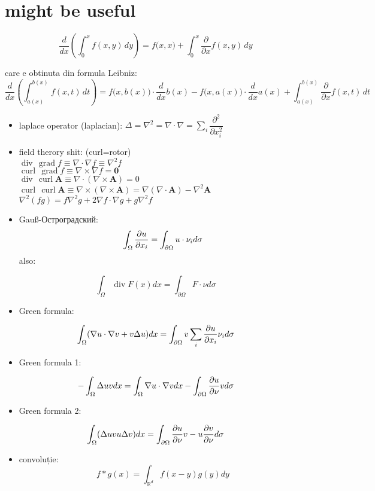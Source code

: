 \documentclass[11pt]{article}
\date{\today}
\title{}
\newcommand{\R}{\mathbb{R}} \newcommand{\C}{\mathbb{C}}
\begin{document}
\section*{might be useful}
\label{sec:org6671fb4}
\[ \frac{d}{dx} \left (\int_{0}^{x} f(x,y)\,dy \right) = f\big(x,x) + \int_{0}^{x}\frac{\partial}{\partial x} f(x,y) \,dy\]

\medskip

care e obtinuta din formula Leibniz:
\[ \frac{d}{dx} \left (\int_{a(x)}^{b(x)}f(x,t)\,dt \right) = f\big(x,b(x)\big)\cdot \frac{d}{dx} b(x) - f\big(x,a(x)\big)\cdot \frac{d}{dx} a(x) + \int_{a(x)}^{b(x)}\frac{\partial}{\partial x} f(x,t) \,dt\]
\begin{itemize}
\item laplace operator (laplacian): \(\Delta = \nabla^2 = \nabla \cdot \nabla = \displaystyle \sum_i \dfrac{\partial^2}{\partial x_i^2}\)
\item field therory shit: (curl=rotor)\\
\(\operatorname{div}  \, \operatorname{grad} f          \equiv \nabla \cdot  \nabla f \equiv \nabla^2 f\)\\
\(\operatorname{curl} \, \operatorname{grad} f          \equiv \nabla \times \nabla f = \mathbf 0\)\\
\(\operatorname{div}  \, \operatorname{curl} \mathbf{A} \equiv \nabla \cdot  (\nabla \times \mathbf{A}) = 0\)\\
\(\operatorname{curl} \, \operatorname{curl} \mathbf{A} \equiv \nabla \times (\nabla \times \mathbf{A}) = \nabla (\nabla \cdot \mathbf{A}) - \nabla^2 \mathbf{A}\)\\
\(\nabla^2 (f g) = f \nabla^2 g + 2 \nabla f \cdot \nabla g + g \nabla^2 f\)
\item Gauß-Остроградский:
\[ \int_\Omega \frac{\partial u}{\partial x_i} = \int_{\partial \Omega}u \cdot \nu_i d \sigma \]
also:
\end{itemize}
\[ \int_\Omega \operatorname{div} F (x) dx = \int_{\partial \Omega} F  \cdot \nu d \sigma \]
\begin{itemize}
\item Green formula:
\end{itemize}
\[\int_\Omega (\nabla u \cdot \nabla v  + v \Delta u) dx = \int_{\partial \Omega} v \sum_i \frac{\partial u}{\partial x_i} \nu_i d \sigma \]
\begin{itemize}
\item Green formula 1:
\end{itemize}
\[ -\int_\Omega \Delta u v dx = \int_\Omega \nabla u \cdot \nabla v dx - \int_{\partial \Omega} \frac{\partial u}{\partial \nu} v  d \sigma \]
\begin{itemize}
\item Green formula 2:
\end{itemize}
\[ \int_\Omega (\Delta u v u\Delta v) dx = \int_{\partial \Omega} \frac{\partial u}{\partial \nu} v - u \frac{\partial v}{\partial \nu}  d \sigma \]
\begin{itemize}
\item convoluție:
\[ f*g (x) = \int_{\R^d} f(x-y) g(y)dy \]
\end{itemize}
\end{document}
